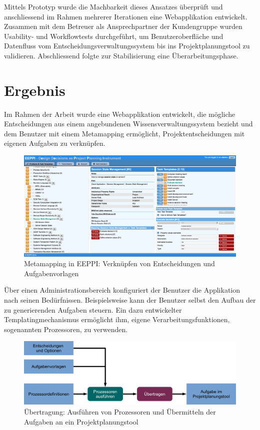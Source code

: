 	Mittels Prototyp wurde die Machbarkeit dieses Ansatzes überprüft 
	und anschliessend im Rahmen mehrerer Iterationen eine Webapplikation entwickelt. 
	Zusammen mit dem Betreuer als Ansprechpartner der Kundengruppe wurden Usability- und Workflowtests durchgeführt, 
	um Benutzeroberfläche und Datenfluss vom Entscheidungsverwaltungssystem bis ins Projektplanungstool zu validieren. 
	Abschliessend folgte zur Stabilisierung eine Überarbeitungsphase.
	
	
	\section{Ergebnis}
		
	Im Rahmen der Arbeit wurde eine Webapplikation entwickelt, 
	die mögliche Entscheidungen aus einem angebundenen Wissensverwaltungssystem bezieht 
	und dem Benutzer mit einem Metamapping ermöglicht,
	Projektentscheidungen mit eigenen Aufgaben zu verknüpfen. 
	
	\begin{figure}[H]
		\includegraphics[width=\textwidth]{introduction/img/eeppiDecisionsAndTaskTemplates.png}
		\centering
		\caption{Metamapping in EEPPI: Verknüpfen von Entscheidungen und Aufgabenvorlagen}
		\label{fig:metamapping}
	\end{figure}	
	
	Über einen Administrationsbereich konfiguriert der Benutzer die Applikation nach seinen Bedürfnissen. 
	Beispielsweise kann der Benutzer selbst den Aufbau der zu generierenden Aufgaben steuern. 
	Ein dazu entwickelter Templatingmechanismus ermöglicht ihm, eigene Verarbeitungsfunktionen, sogenannten Prozessoren, zu verwenden. 
	
	\begin{figure}[H]
		\includegraphics[width=\textwidth]{introduction/img/simpleProcessWorkflow.jpg}
		\centering
		\caption{Übertragung: Ausführen von Prozessoren und Übermitteln der Aufgaben an ein Projektplanungstool}
		\label{fig:metamapping}
	\end{figure}
	
